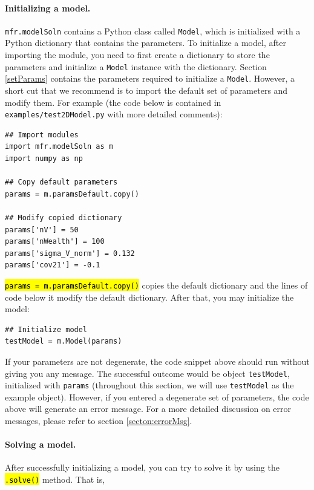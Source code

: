 \documentclass[12pt]{article}
\newcommand{\modelSolnProg}{mfr.modelSoln\xspace}
\DeclareRobustCommand{\hlCODE}[1]{{\sethlcolor{backcolour}\hl{#1}}}
\begin{document}
\paragraph{Initializing a model.} \texttt{\modelSolnProg} contains a Python class called \texttt{Model}, which is initialized with a Python dictionary that contains the parameters. To initialize a model, after importing the module, you need to first create a dictionary to store the parameters and initialize a \texttt{Model} instance with the dictionary. Section \ref{setParams} contains the parameters required to initialize a \texttt{Model}. However, a short cut that we recommend is to import the default set of parameters and modify them. For example (the code below is contained in \texttt{examples/test2DModel.py} with more detailed comments): 
 
\begin{verbatim}
## Import modules
import mfr.modelSoln as m
import numpy as np

## Copy default parameters
params = m.paramsDefault.copy()

## Modify copied dictionary
params['nV'] = 50
params['nWealth'] = 100
params['sigma_V_norm'] = 0.132
params['cov21'] = -0.1 
\end{verbatim}


\hlCODE{\texttt{params = m.paramsDefault.copy()}} copies the default dictionary and the lines of code below it modify the default dictionary. After that, you may initialize the model:

\begin{verbatim}
## Initialize model
testModel = m.Model(params)
\end{verbatim}

If your parameters are not degenerate, the code snippet above should run without giving you any message. The successful outcome would be object \texttt{testModel}, initialized with \texttt{params} (throughout this section, we will use \texttt{testModel} as the example object). However, if you entered a degenerate set of parameters, the code above will generate an error message. For a more detailed discussion on error messages, please refer to section \ref{secton:errorMsg}.\\

\paragraph{Solving a model.} After successfully initializing a model, you can try to solve it by using the \hlCODE{\texttt{.solve()}} method. That is,
\end{document}
